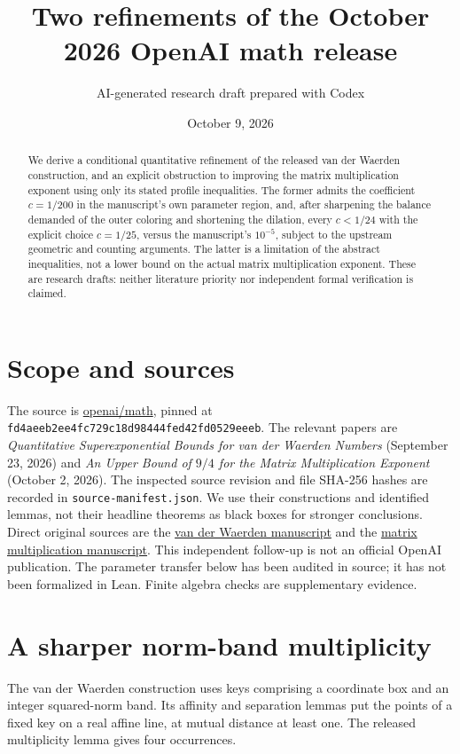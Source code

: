 \documentclass[11pt]{article}
\title{Two refinements of the October 2026 OpenAI math release}
\author{AI-generated research draft prepared with Codex}
\date{October 9, 2026}
\begin{document}
\maketitle
\begin{abstract}
We derive a conditional quantitative refinement of the released van der
Waerden construction, and an explicit obstruction to improving the matrix
multiplication exponent using only its stated profile inequalities.
The former admits the coefficient $c=1/200$ in the manuscript's own
parameter region, and, after sharpening the balance demanded of the
outer coloring and shortening the dilation, every $c<1/24$ with the
explicit choice $c=1/25$, versus the manuscript's $10^{-5}$, subject to
the upstream geometric and counting arguments.
The latter is a limitation of the abstract inequalities, not a lower bound
on the actual matrix multiplication exponent. These are research drafts:
neither literature priority nor independent formal verification is claimed.
\end{abstract}

\section{Scope and sources}
The source is \href{https://github.com/openai/math}{openai/math}, pinned at
\texttt{fd4aeeb2ee4fc729c18d98444fed42fd0529eeeb}.
The relevant papers are \emph{Quantitative Superexponential Bounds for van
der Waerden Numbers} (September 23, 2026) and \emph{An Upper Bound of
$9/4$ for the Matrix Multiplication Exponent} (October 2, 2026).
The inspected source revision and file SHA-256 hashes are recorded in
\texttt{source-manifest.json}. We use their constructions and identified
lemmas, not their headline theorems as black boxes for stronger conclusions.
Direct original sources are the
\href{https://github.com/openai/math/tree/fd4aeeb2ee4fc729c18d98444fed42fd0529eeeb/preprints/Quantitative-Superexponential-Bounds-for-van-der-Waerden-Numbers-September-23-2026}{van der Waerden manuscript}
and the
\href{https://github.com/openai/math/tree/fd4aeeb2ee4fc729c18d98444fed42fd0529eeeb/preprints/Matrix-Multiplication-Nine-Fourths-October-2-2026}{matrix multiplication manuscript}.
This independent follow-up is not an official OpenAI publication.
The parameter transfer below has been audited in source; it has not been
formalized in Lean. Finite algebra checks are supplementary evidence.

\section{A sharper norm-band multiplicity}
The van der Waerden construction uses keys comprising a coordinate box
and an integer squared-norm band. Its affinity and separation lemmas put
the points of a fixed key on a real affine line, at mutual distance at
least one. The released multiplicity lemma gives four occurrences.
\end{document}
